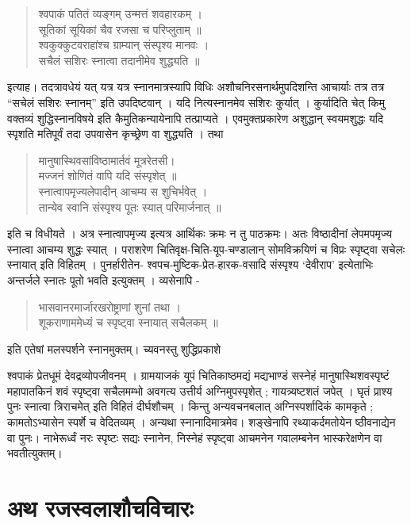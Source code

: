 {\begin{verse}
श्वपाकं पतितं व्यङ्गम् उन्मत्तं शवहारकम् । \\
सूतिकां सूयिकां चैव रजसा च परिप्लुताम् ॥ \\
श्वकुक्कुटवराहांश्च ग्राम्यान् संस्पृश्य मानवः । \\
सचैलं सशिरः स्नात्वा तदानीमेव शुद्ध्यति ॥
\end{verse}
इत्याह। तदत्रावधेयं यत् यत्र यत्र स्नानमात्रस्यापि विधिः अशौचनिरसनार्थमुपदिशन्ति आचार्याः तत्र तत्र “सचेलं सशिरः स्नानम्” इति उपदिष्टवान् । यदि नित्यस्नानमेव सशिरः कुर्यात् । कुर्यादिति चेत् किमु वक्तव्यं शुद्धिस्नानविषये इति कैमुतिकन्यायेनापि तत्प्राप्यते । एवमुक्तप्रकारेण अशुद्धान् स्वयमशुद्धः यदि स्पृशति मतिपूर्वं तदा उपवासेन कृच्छ्रेण वा शुद्ध्यति । तथा 
\begin{verse}
मानुषास्थिवसांविष्ठामार्तवं मूत्ररेतसी। \\
मज्जनं शोणितं वापि यदि संस्पृशेत् ॥ \\
स्नात्वापमृज्यलेपादीन् आचम्य स शुचिर्भवेत् ।\\ 
तान्येव स्वानि संस्पृश्य पूतः स्यात् परिमार्जनात् ॥
\end{verse}
इति च विधीयते । अत्र स्नात्वापमृज्य इत्यत्र आर्थिकः क्रमः न तु पाठक्रमः। अतः विष्ठादीनां लेपमपमृज्य स्नात्वा आचम्य शुद्धः स्यात् । पराशरेण चितिवृक्ष-चिति-यूप-चण्डालान् सोमविक्रयिणं च विप्रः स्पृष्ट्वा सचेलः स्नायात् इति विहितम् । पुनर्हारीतेन- श्वपच-मुष्टिक-प्रेत-हारक-वसादि संस्पृश्य ‘देवीराप’ इत्येताभिः अन्तर्जले स्नातः पूतो भवति इत्युक्तम् । व्यसेनापि - 
\begin{verse}
भासवानरमार्जारखरोष्ट्राणां शुनां तथा ।\\
शूकराणाममेध्यं च स्पृष्ट्वा स्नायात् सचैलकम् ॥  
\end{verse}

इति एतेषां मलस्पर्शने स्नानमुक्तम्। च्यवनस्तु शुद्धिप्रकाशे 

श्वपाकं प्रेतधूमं देवद्रव्योपजीवनम् । ग्रामयाजकं यूपं चितिकाष्ठमद्यं मद्यभाण्डं सस्नेहं मानुषास्थिशवस्पृष्टं महापातकिनं शवं स्पृष्ट्वा सचैलमम्भो अवगत्य उत्तीर्य अग्निमुपस्पृशेत् ; गायत्र्यष्टशतं जपेत् । घृतं प्राश्य पुनः स्नात्वा त्रिराचमेत् इति विहितं दीर्घशौचम् । किन्तु अन्यवचनबलात् अग्निस्पर्शादिकं कामकृते ; कामतोऽभ्यासेन स्पर्शे च वेदितव्यम् । अन्यथा स्नानादिमात्रमेव। शङ्खेनापि रथ्याकर्दमतोयेन ष्ठीवनाद्येन वा पुनः। नाभेरूर्ध्वं नरः स्पृष्टः सद्यः स्नानेन, निस्नेहं स्पृष्ट्वा आचमनेन गवालम्बनेन भास्करेक्षणेन वा भवतीत्युक्तम्।

\section*{अथ रजस्वलाशौचविचारः}

}
